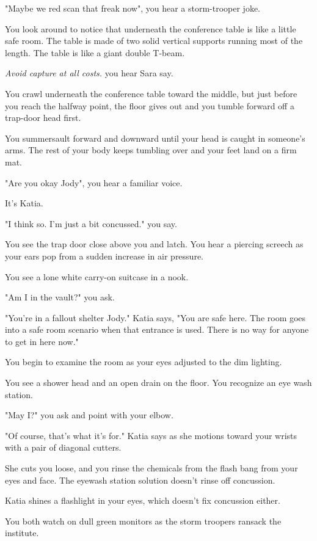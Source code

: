 \documentclass[a5paper, symmetric]{tufte-book}
\begin{document}
"Maybe we red scan that freak now", you hear a storm-trooper joke. 

You look around to notice that underneath the conference table is like a little safe room. The table is made of two solid vertical supports running most of the length. The table is like a giant double T-beam. 

\textit{Avoid capture at all costs.} you hear Sara say.

You crawl underneath the conference table toward the middle, but just before you reach the halfway point, the floor gives out and you tumble forward off a trap-door head first. 

You summersault forward and downward until your head is caught in someone's arms. The rest of your body keeps tumbling over and your feet land on a firm mat.  

"Are you okay Jody", you hear a familiar voice. 

It's Katia. 

"I think so. I'm just a bit concussed." you say. 

You see the trap door close above you and latch. You hear a piercing screech as your ears pop from a sudden increase in air pressure. 

You see a lone white carry-on suitcase in a nook. 

"Am I in the vault?" you ask.

"You're in a fallout shelter Jody." Katia says, "You are safe here. The room goes into a safe room scenario when that entrance is used. There is no way for anyone to get in here now."

You begin to examine the room as your eyes adjusted to the dim lighting. 

You see a shower head and an open drain on the floor. You recognize an eye wash station. 

"May I?" you ask and point with your elbow. 

"Of course, that's what it's for." Katia says as she motions toward your wrists with a pair of diagonal cutters. 

She cuts you loose, and you rinse the chemicals from the flash bang from your eyes and face.  The eyewash station solution doesn't rinse off concussion. 

Katia shines a flashlight in your eyes, which doesn't fix concussion either. 

You both watch on dull green monitors as the storm troopers ransack the institute. 
\end{document}

